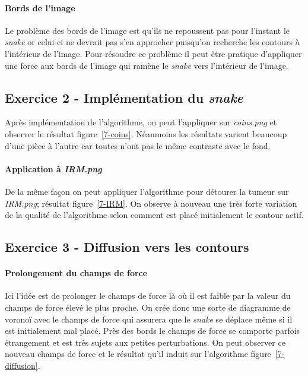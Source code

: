 \begin{figure}
\end{figure}

\paragraph{Bords de l'image}
Le problème des bords de l'image est qu'ils ne repoussent pas pour l'instant le \emph{snake} or celui-ci ne devrait pas s'en approcher puisqu'on recherche les contours à l'intérieur de l'image. Pour résoudre ce problème il peut être pratique d'appliquer une force aux bords de l'image qui ramène le \emph{snake} vers l'intérieur de l'image.

\subsection{Exercice 2 - Implémentation du \emph{snake}}
Après implémentation de l'algorithme, on peut l'appliquer sur \emph{coins.png} et observer le résultat figure~\ref{7-coins}. Néanmoins les résultats varient beaucoup d'une pièce à l'autre car toutes n'ont pas le même contraste avec le fond.

\begin{figure}
\end{figure}

\paragraph{Application à \emph{IRM.png}}
De la même façon on peut appliquer l'algorithme pour détourer la tumeur sur \emph{IRM.png}; résultat figure~\ref{7-IRM}. On observe à nouveau une très forte variation de la qualité de l'algorithme selon comment est placé initialement le contour actif.

\begin{figure}
\end{figure}

\subsection{Exercice 3 - Diffusion vers les contours}
\paragraph{Prolongement du champs de force}
Ici l'idée est de prolonger le champs de force là où il est faible par la valeur du champs de force élevé le plus proche. On crée donc une sorte de diagramme de voronoï avec le champs de force qui assurera que le \emph{snake} se déplace même si il est initialement mal placé. Près des bords le champs de force se comporte parfois étrangement et est très sujets aux petites perturbations. On peut observer ce nouveau champs de force et le résultat qu'il induit sur l'algorithme figure~\ref{7-diffusion}.

